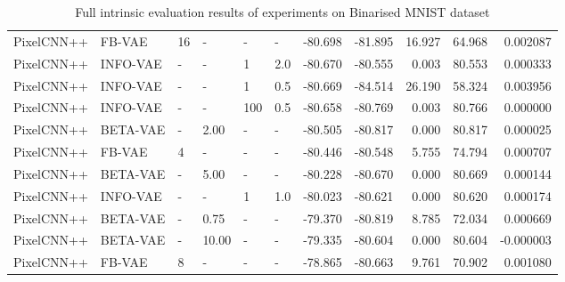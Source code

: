 \begin{table}[!htb]
\begin{tabular}{llllll|rrrrr}
 PixelCNN++ &    FB-VAE &        16 &      - &     - &      - &      -80.698 &      -81.895 &      16.927 &      64.968 &   0.002087 \\
 PixelCNN++ &  INFO-VAE &         - &      - &     1 &  2.0 &      -80.670 &      -80.555 &       0.003 &      80.553 &   0.000333 \\
 PixelCNN++ &  INFO-VAE &         - &      - &     1 &  0.5 &      -80.669 &      -84.514 &      26.190 &      58.324 &   0.003956 \\
 PixelCNN++ &  INFO-VAE &         - &      - &   100 &  0.5 &      -80.658 &      -80.769 &       0.003 &      80.766 &   0.000000 \\
 PixelCNN++ &  BETA-VAE &         - &  2.00 &     - &      - &      -80.505 &      -80.817 &       0.000 &      80.817 &   0.000025 \\
 PixelCNN++ &    FB-VAE &         4 &      - &     - &      - &      -80.446 &      -80.548 &       5.755 &      74.794 &   0.000707 \\
 PixelCNN++ &  BETA-VAE &         - &  5.00 &     - &      - &      -80.228 &      -80.670 &       0.000 &      80.669 &   0.000144 \\
 PixelCNN++ &  INFO-VAE &         - &      - &     1 &  1.0 &      -80.023 &      -80.621 &       0.000 &      80.620 &   0.000174 \\
 PixelCNN++ &  BETA-VAE &         - &  0.75 &     - &      - &      -79.370 &      -80.819 &       8.785 &      72.034 &   0.000669 \\
 PixelCNN++ &  BETA-VAE &         - & 10.00 &     - &      - &      -79.335 &      -80.604 &       0.000 &      80.604 &  -0.000003 \\
 PixelCNN++ &    FB-VAE &         8 &      - &     - &      - &      -78.865 &      -80.663 &       9.761 &      70.902 &   0.001080 \\
\bottomrule
    \end{tabular}
    \caption{Full intrinsic evaluation results of experiments on Binarised MNIST dataset}
    \label{tab:bmnist_full_results}
\end{table}

